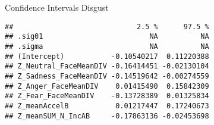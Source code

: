 \documentclass[
]{article}
\begin{document}
Confidence Intervals Disgust

\begin{verbatim}
##                             2.5 %      97.5 %
## .sig01                         NA          NA
## .sigma                         NA          NA
## (Intercept)           -0.10540217  0.11220388
## Z_Neutral_FaceMeanDIV -0.16414451 -0.02130104
## Z_Sadness_FaceMeanDIV -0.14519642 -0.00274559
## Z_Anger_FaceMeanDIV    0.01415490  0.15842309
## Z_Fear_FaceMeanDIV    -0.13728389  0.01325834
## Z_meanAccelB           0.01217447  0.17240673
## Z_meanSUM_N_IncAB     -0.17863136 -0.02453698
\end{verbatim}
\end{document}
